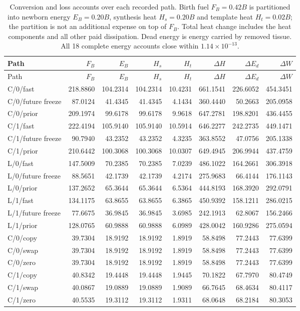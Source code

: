 \begin{longtable}{lrrrrrrr}
\caption{Conversion and loss accounts over each recorded path. Birth fuel $F_B=0.42B$ is partitioned into newborn energy $E_B=0.20B$, synthesis heat $H_s=0.20B$ and template heat $H_t=0.02B$; the partition is not an additional expense on top of $F_B$. Total heat change includes the heat components and all other paid dissipation. Dead energy is energy carried by removed tissue. All 18 complete energy accounts close within $1.14\times10^{-13}$.}\label{tab:young-conversion}\\
\toprule
Path & $F_B$ & $E_B$ & $H_s$ & $H_t$ & $\Delta H$ & $\Delta E_d$ & $\Delta W$ \\
\midrule\endfirsthead
\toprule
Path & $F_B$ & $E_B$ & $H_s$ & $H_t$ & $\Delta H$ & $\Delta E_d$ & $\Delta W$ \\
\midrule\endhead
C/0/fast & 218.8860 & 104.2314 & 104.2314 & 10.4231 & 661.1541 & 226.6052 & 454.3451 \\
C/0/future freeze & 87.0124 & 41.4345 & 41.4345 & 4.1434 & 360.4440 & 50.2663 & 205.0958 \\
C/0/prior & 209.1974 & 99.6178 & 99.6178 & 9.9618 & 647.2781 & 198.8201 & 436.4455 \\
C/1/fast & 222.4194 & 105.9140 & 105.9140 & 10.5914 & 646.2277 & 242.2735 & 449.1471 \\
C/1/future freeze & 90.7940 & 43.2352 & 43.2352 & 4.3235 & 363.8552 & 47.0756 & 205.1338 \\
C/1/prior & 210.6442 & 100.3068 & 100.3068 & 10.0307 & 649.4945 & 206.9944 & 437.4759 \\
L/0/fast & 147.5009 & 70.2385 & 70.2385 & 7.0239 & 486.1022 & 164.2661 & 306.3918 \\
L/0/future freeze & 88.5651 & 42.1739 & 42.1739 & 4.2174 & 275.9683 & 66.4144 & 176.1143 \\
L/0/prior & 137.2652 & 65.3644 & 65.3644 & 6.5364 & 444.8193 & 168.3920 & 292.0791 \\
L/1/fast & 134.1175 & 63.8655 & 63.8655 & 6.3865 & 450.9392 & 158.1211 & 286.0215 \\
L/1/future freeze & 77.6675 & 36.9845 & 36.9845 & 3.6985 & 242.1913 & 62.8067 & 156.2466 \\
L/1/prior & 128.0765 & 60.9888 & 60.9888 & 6.0989 & 428.0042 & 160.9286 & 275.0594 \\
C/0/copy & 39.7304 & 18.9192 & 18.9192 & 1.8919 & 58.8498 & 77.2443 & 77.6399 \\
C/0/swap & 39.7304 & 18.9192 & 18.9192 & 1.8919 & 58.8498 & 77.2443 & 77.6399 \\
C/0/zero & 39.7304 & 18.9192 & 18.9192 & 1.8919 & 58.8498 & 77.2443 & 77.6399 \\
C/1/copy & 40.8342 & 19.4448 & 19.4448 & 1.9445 & 70.1822 & 67.7970 & 80.4749 \\
C/1/swap & 40.0867 & 19.0889 & 19.0889 & 1.9089 & 66.7645 & 68.4634 & 80.4117 \\
C/1/zero & 40.5535 & 19.3112 & 19.3112 & 1.9311 & 68.0648 & 68.2184 & 80.3053 \\
\bottomrule
\end{longtable}
